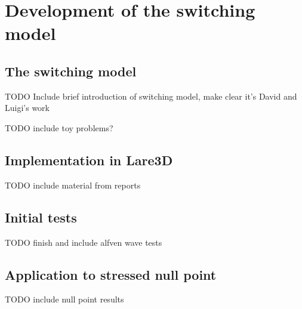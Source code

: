 \chapter{Development of the switching model}

\section{The switching model}

TODO Include brief introduction of switching model, make clear it's David and Luigi's work

TODO include toy problems?

\section{Implementation in Lare3D}

TODO include material from reports

\section{Initial tests}

TODO finish and include alfven wave tests

\section{Application to stressed null point}

TODO include null point results
